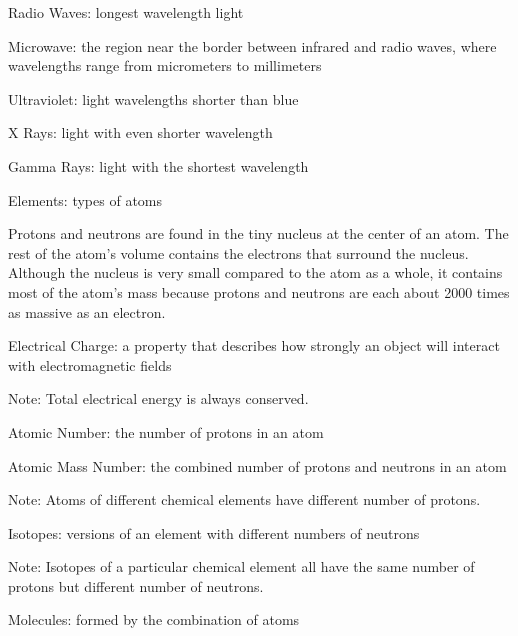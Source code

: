 \documentclass[12pt]{article}
\begin{document}
\begin{definition} Radio Waves: longest wavelength light \end{definition}
\begin{definition} Microwave: the region near the border between infrared and radio waves, where wavelengths range from micrometers to millimeters \end{definition}
\begin{definition} Ultraviolet: light wavelengths shorter than blue \end{definition}
\begin{definition} X Rays: light with even shorter wavelength \end{definition}
\begin{definition} Gamma Rays: light with the shortest wavelength \end{definition}
\begin{definition} Elements: types of atoms \end{definition}
Protons and neutrons are found in the tiny nucleus at the center of an atom. The rest of the atom's volume contains the electrons that surround the nucleus. Although the nucleus is very small compared to the atom as a whole, it contains most of the atom's mass because protons and neutrons are each about 2000 times as massive as an electron. 
\begin{definition} Electrical Charge: a property that describes how strongly an object will interact with electromagnetic fields \end{definition}
Note: Total electrical energy is always conserved. 
\begin{definition} Atomic Number: the number of protons in an atom \end{definition}
\begin{definition} Atomic Mass Number: the combined number of protons and neutrons in an atom \end{definition}
Note: Atoms of different chemical elements have different number of protons. 
\begin{definition} Isotopes: versions of an element with different numbers of neutrons \end{definition}
Note: Isotopes of a particular chemical element all have the same number of protons but different number of neutrons. 
\begin{definition} Molecules: formed by the combination of atoms \end{definition}
\end{document}
